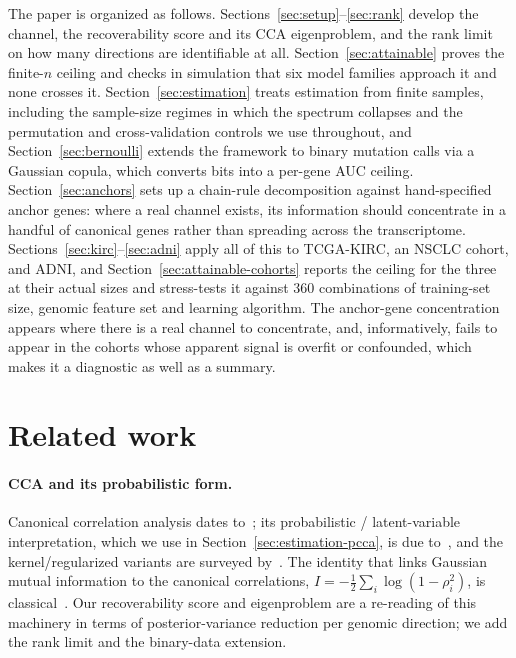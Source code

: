 \documentclass{article}
\begin{document}
The paper is organized as follows. Sections~\ref{sec:setup}--\ref{sec:rank}
develop the channel, the recoverability score and its CCA eigenproblem, and the
rank limit on how many directions are identifiable at all.
Section~\ref{sec:attainable} proves the finite-$n$ ceiling and checks in
simulation that six model families approach it and none crosses it.
Section~\ref{sec:estimation} treats estimation from finite samples, including
the sample-size regimes in which the spectrum collapses and the permutation and
cross-validation controls we use throughout, and
Section~\ref{sec:bernoulli} extends the framework to binary mutation calls via a
Gaussian copula, which converts bits into a per-gene AUC ceiling.
Section~\ref{sec:anchors} sets up a chain-rule decomposition against
hand-specified anchor genes: where a real channel exists, its information should
concentrate in a handful of canonical genes rather than spreading across the
transcriptome. Sections~\ref{sec:kirc}--\ref{sec:adni} apply all of this to
TCGA-KIRC, an NSCLC cohort, and ADNI, and Section~\ref{sec:attainable-cohorts}
reports the ceiling for the three at their actual sizes and stress-tests it
against $360$ combinations of training-set size, genomic feature set and
learning algorithm. The anchor-gene concentration appears where there is a real
channel to concentrate, and, informatively, fails to appear in the cohorts whose
apparent signal is overfit or confounded, which makes it a diagnostic as well as
a summary.

\section{Related work}
\label{sec:related}

\paragraph{CCA and its probabilistic form.}
Canonical correlation analysis dates to~\citet{hotelling1936cca}; its
probabilistic / latent-variable interpretation, which we use in
Section~\ref{sec:estimation-pcca}, is due to~\citet{bach2005pcca}, and the
kernel/regularized variants are surveyed by~\citet{hardoon2004kcca}. The
identity that links Gaussian mutual information to the canonical correlations,
$I=-\tfrac12\sum_i\log(1-\rho_i^2)$, is classical~\citep{cover2006elements}. Our
recoverability score and eigenproblem are a re-reading of this machinery in
terms of posterior-variance reduction per genomic direction; we add the rank
limit and the binary-data extension.
\end{document}
